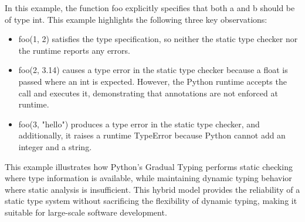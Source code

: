 In this example, the function foo explicitly specifies that both a and b should
be of type int.
This example highlights the following three key observations:

\begin{itemize}
  \item foo(1, 2) satisfies the type specification, so neither the static type
    checker nor the runtime reports any errors.

  \item foo(2, 3.14) causes a type error in the static type checker because a
    float is passed where an int is expected. However, the Python runtime accepts
    the call and executes it, demonstrating that annotations are not enforced at
    runtime.

  \item foo(3, "hello") produces a type error in the static type checker, and
    additionally, it raises a runtime TypeError because Python cannot add an
    integer and a string.
\end{itemize}

This example illustrates how Python's Gradual Typing performs static checking
where type information is available, while maintaining dynamic typing behavior
where static analysis is insufficient.
This hybrid model provides the reliability of a static type system without
sacrificing the flexibility of dynamic typing, making it suitable for
large-scale software development.

